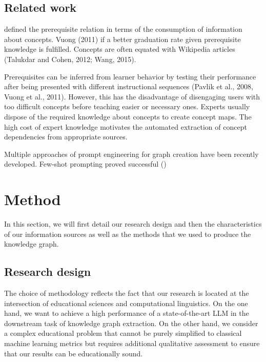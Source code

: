 \documentclass{article}
\begin{document}
\subsection{Related work}
\cite{talukdar2012crowdsourced} defined the prerequisite relation in terms of the consumption of information about concepts. Vuong (2011) if a better graduation rate given prerequisite knowledge is fulfilled. Concepts are often equated with Wikipedia articles (Talukdar and Cohen, 2012; Wang, 2015).

Prerequisites can be inferred from learner behavior by testing their performance after being presented with different instructional sequences (Pavlik et al., 2008, Vuong et al., 2011). However, this has the disadvantage of disengaging users with too difficult concepts before teaching easier or necessary ones. Experts usually dispose of the required knowledge about concepts to create concept maps. The high cost of expert knowledge motivates the automated extraction of concept dependencies from appropriate sources.



Multiple approaches of prompt engineering for graph creation have been recently developed. Few-shot prompting proved successful (\cite{cohen2023crawling})


\section{Method}
In this section, we will first detail our research design and then the characteristics of our information sources as well as the methods that we used to produce the knowledge graph. 

\subsection{Research design} 
The choice of methodology reflects the fact that our research is located at the intersection of educational sciences and computational linguistics. On the one hand, we want to achieve a high performance of a state-of-the-art LLM in the downstream task of knowledge graph extraction. On the other hand, we consider a complex educational problem that cannot be purely simplified to classical machine learning metrics but requires additional qualitative assessment to ensure that our results can be educationally sound.
\end{document}

